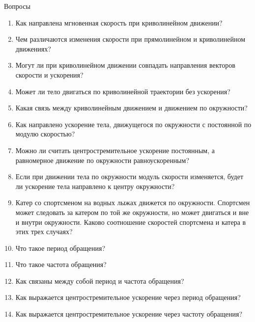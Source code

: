 \documentclass[a6paper, 11pt]{diss_4}
\renewcommand{\'}{\,'}
\begin{document}
\begin{center}
   Вопросы
\end{center}
\begin{enumerate}
\item Как   направлена   мгновенная   скорость при криволинейном движении?
\item Чем различаются  изменения скорости при прямолинейном и криволинейном движениях?
\item Могут ли  при  криволинейном движении   совпадать   направления   векторов   скорости и ускорения?
\item Может   ли   тело   двигаться   по   криволинейной траектории без ускорения?
\item Какая    связь    между    криволинейным движением    и    движением    по   окружности?
\item Как направлено ускорение тела,  движущегося   по   окружности   с   постоянной   по модулю скоростью?
\item Можно ли считать центростремительное  ускорение  постоянным,  а  равномерное движение     по     окружности     равноускоренным?
\item Если   при   движении   тела   по   окружности   модуль   скорости   изменяется,   будет ли    ускорение   тела    направлено    к    центру окружности?
\item Катер со спортсменом на водных лыжах движется по окружности. Спортсмен может следовать за катером по той же окружности, но может двигаться и вне и внутри окружности. Каково соотношение скоростей спортсмена и катера в этих трех случаях?
\item Что такое период обращения?
\item Что такое частота обращения?
\item Как  связаны  между  собой   период  и частота обращения?
\item Как выражается центростремительное ускорение через период обращения?
\item Как выражается центростремительное ускорение через частоту обращения?
\end{enumerate}
\end{document}
